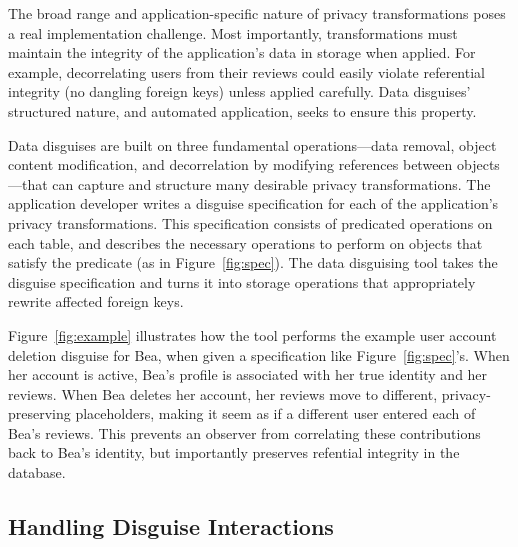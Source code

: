 %
The broad range and application-specific nature of privacy transformations poses a real
implementation challenge.
%
Most importantly, transformations must maintain the integrity of the application's data
in storage when applied.
%
For example, decorrelating users from their reviews could easily violate referential
integrity (\ie no dangling foreign keys) unless applied carefully.
%
%
Data disguises' structured nature, and automated application, seeks to ensure this
property.
%

%
Data disguises are built on three fundamental operations---data removal, object content
modification, and decorrelation by modifying references between objects---that can
capture and structure many desirable privacy transformations.
%
The application developer writes a disguise specification for each of the application's
privacy transformations.
%
This specification consists of predicated operations on each table, and describes
the necessary operations to perform on objects that satisfy the predicate
(\eg as in Figure~\ref{fig:spec}).
%
The data disguising tool takes the disguise specification and turns it into storage
operations that appropriately rewrite affected foreign keys.
%

%
Figure~\ref{fig:example} illustrates how the tool performs the example user
account deletion disguise for Bea, when given a specification like Figure~\ref{fig:spec}'s.
%
When her account is active, Bea's profile is associated with her true identity and her
reviews.
%
When Bea deletes her account, her reviews move to different, privacy-preserving
placeholders, making it seem as if a different user entered each of Bea's reviews.
%
This prevents an observer from correlating these contributions back to Bea's identity,
but importantly preserves refential integrity in the database.
%

%
%
%

\subsection{Handling Disguise Interactions}

